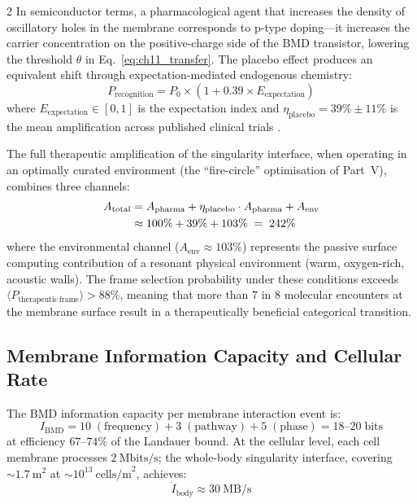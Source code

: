 \begin{multicols}{2}
In semiconductor terms, a pharmacological agent that increases the density of oscillatory holes in the membrane corresponds to p-type doping---it increases the carrier concentration on the positive-charge side of the BMD transistor, lowering the threshold $\theta$ in Eq.~\ref{eq:ch11_transfer}. The placebo effect produces an equivalent shift through expectation-mediated endogenous chemistry:
\begin{equation}
P_{\mathrm{recognition}} = P_0 \times (1 + 0.39 \times E_{\mathrm{expectation}})
\label{eq:ch11_placebo}
\end{equation}
where $E_{\mathrm{expectation}} \in [0, 1]$ is the expectation index and $\eta_{\mathrm{placebo}} = 39\% \pm 11\%$ is the mean amplification across published clinical trials \citep{benedetti2014placebo}.

The full therapeutic amplification of the singularity interface, when operating in an optimally curated environment (the ``fire-circle'' optimisation of Part~V), combines three channels:
\begin{align}
A_{\mathrm{total}} &= A_{\mathrm{pharma}} + \eta_{\mathrm{placebo}} \cdot A_{\mathrm{pharma}} + A_{\mathrm{env}} \notag\\
                    &\approx 100\% + 39\% + 103\% \;=\; 242\%
\label{eq:ch11_firecircle}
\end{align}
where the environmental channel ($A_{\mathrm{env}} \approx 103\%$) represents the passive surface computing contribution of a resonant physical environment (warm, oxygen-rich, acoustic walls). The frame selection probability under these conditions exceeds $\langle P_{\mathrm{therapeutic\,frame}}\rangle > 88\%$, meaning that more than 7 in 8 molecular encounters at the membrane surface result in a therapeutically beneficial categorical transition.

\subsection{Membrane Information Capacity and Cellular Rate}

The BMD information capacity per membrane interaction event is:
\begin{equation}
I_{\mathrm{BMD}} = 10\;(\text{frequency}) + 3\;(\text{pathway}) + 5\;(\text{phase}) = 18\text{--}20\;\mathrm{bits}
\label{eq:ch11_ibmd}
\end{equation}
at efficiency $67$--$74\%$ of the Landauer bound. At the cellular level, each cell membrane processes $2\ \mathrm{Mbits/s}$; the whole-body singularity interface, covering $\sim 1.7\ \mathrm{m}^2$ at $\sim 10^{13}\ \mathrm{cells/m}^2$, achieves:
\begin{equation}
\dot{I}_{\mathrm{body}} \approx 30\ \mathrm{MB/s}
\label{eq:ch11_bodyrate}
\end{equation}

\end{multicols}

